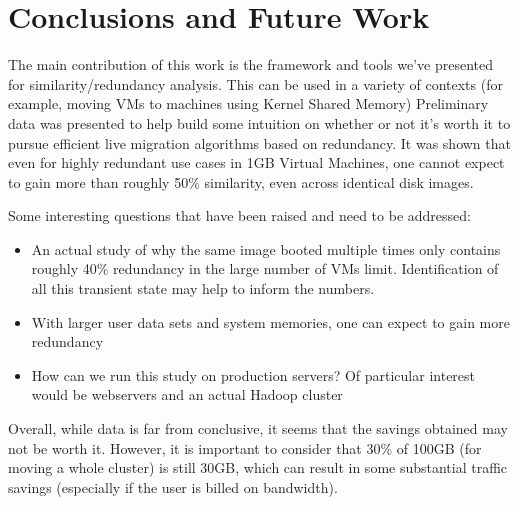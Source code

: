 \documentclass{acm_proc_article-sp}
\begin{document}
\section{Conclusions and Future Work}
The main contribution of this work is the framework and tools we've presented for similarity/redundancy analysis.  This can be used in a variety of contexts (for example, moving VMs to machines using Kernel Shared Memory) Preliminary data was presented to help build some intuition on whether or not it's worth it to pursue efficient live migration algorithms based on redundancy.  It was shown that even for highly redundant use cases in 1GB Virtual Machines, one cannot expect to gain more than roughly 50\% similarity, even across identical disk images.

Some interesting questions that have been raised and need to be addressed:
\begin{itemize}
  \item An actual study of why the same image booted multiple times only contains roughly 40\% redundancy in the large number of VMs limit.  Identification of all this transient state may help to inform the numbers.   
  \item With larger user data sets and system memories, one can expect to gain more redundancy
  \item How can we run this study on production servers? Of particular interest would be webservers and an actual Hadoop cluster
\end{itemize}

Overall, while data is far from conclusive, it seems that the savings obtained may not be worth it.  However, it is important to consider that 30\% of 100GB (for moving a whole cluster) is still 30GB, which can result in some substantial traffic savings (especially if the user is billed on bandwidth).




\end{document}
